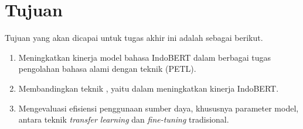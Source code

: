 \section{Tujuan}

Tujuan yang akan dicapai untuk tugas akhir ini adalah sebagai berikut.

\begin{enumerate}
    \item Meningkatkan kinerja model bahasa IndoBERT dalam berbagai tugas pengolahan bahasa alami dengan teknik \PETL (PETL).
    \item Membandingkan teknik \PETL, yaitu \methodPETL dalam meningkatkan kinerja IndoBERT.
    \item Mengevaluasi efisiensi penggunaan sumber daya, khususnya parameter model, antara teknik \textit{transfer learning} dan \textit{fine-tuning} tradisional.
\end{enumerate}